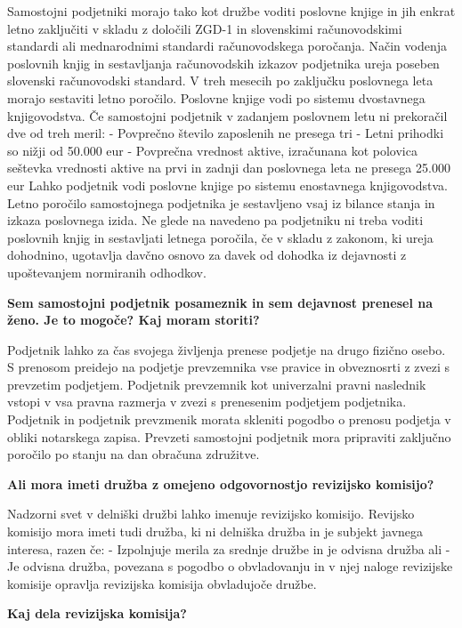 \documentclass[a4paper,12pt,openright]{book}
\begin{document}
Samostojni podjetniki morajo tako kot družbe voditi poslovne knjige in jih enkrat letno zaključiti v skladu z določili ZGD-1 in slovenskimi računovodskimi standardi ali mednarodnimi standardi računovodskega poročanja. Način vodenja poslovnih knjig in sestavljanja računovodskih izkazov podjetnika ureja poseben slovenski računovodski standard. V treh mesecih po zaključku poslovnega leta morajo sestaviti letno poročilo. Poslovne knjige vodi po sistemu dvostavnega knjigovodstva. Če samostojni podjetnik v zadanjem poslovnem letu ni prekoračil dve od treh meril:
- Povprečno število zaposlenih ne presega tri
- Letni prihodki so nižji od 50.000 eur
- Povprečna vrednost aktive, izračunana kot polovica seštevka vrednosti aktive na prvi in zadnji dan poslovnega leta ne presega 25.000 eur
Lahko podjetnik vodi poslovne knjige po sistemu enostavnega knjigovodstva.
Letno poročilo samostojnega podjetnika je sestavljeno vsaj iz bilance stanja in izkaza poslovnega izida.
Ne glede na navedeno pa podjetniku ni treba voditi poslovnih knjig in sestavljati letnega poročila, če v skladu z zakonom, ki ureja dohodnino, ugotavlja davčno osnovo za davek od dohodka iz dejavnosti z upoštevanjem normiranih odhodkov.

\textbf{Sem samostojni podjetnik posameznik in sem dejavnost prenesel na ženo. Je to mogoče? Kaj moram storiti?}

Podjetnik lahko za čas svojega življenja prenese podjetje na drugo fizično osebo. S prenosom preidejo na podjetje prevzemnika vse pravice in obveznosrti z zvezi s prevzetim podjetjem. Podjetnik prevzemnik kot univerzalni pravni naslednik vstopi v vsa pravna razmerja v zvezi s prenesenim podjetjem podjetnika. Podjetnik in podjetnik prevzmenik morata skleniti pogodbo o prenosu podjetja v obliki notarskega zapisa.
Prevzeti samostojni podjetnik mora pripraviti zaključno poročilo po stanju na dan obračuna združitve.

\textbf{Ali mora imeti družba z omejeno odgovornostjo revizijsko komisijo?}

Nadzorni svet v delniški družbi lahko imenuje revizijsko komisijo.
Revijsko komisijo mora imeti tudi družba, ki ni delniška družba in je subjekt javnega interesa, razen če:
- Izpolnjuje merila za srednje družbe in je odvisna družba ali
- Je odvisna družba, povezana s pogodbo o obvladovanju in v njej naloge revizijske komisije opravlja revizijska komisija obvladujoče družbe.

\textbf{Kaj dela revizijska komisija?}
\end{document}
